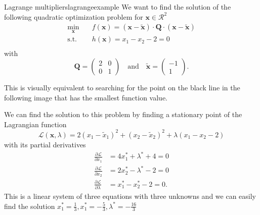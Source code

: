 \begin{example}{Lagrange multipliers}{lagrangeexample}
    We want to find the solution of the following quadratic optimization problem for $\mathbf{x} \in \mathcal{R}^2$
    \begin{equation}
        \begin{aligned}
            \min_{\mathbf{x}} \quad & f(\mathbf{x})= (\mathbf{x}-\tilde{\mathbf{x}}) \cdot \mathbf{Q} \cdot (\mathbf{x}-\tilde{\mathbf{x}})\\
            \textrm{s.t.} \quad     & h(\mathbf{x}) = x_1 - x_2 - 2 = 0  \\
        \end{aligned}
    \end{equation}
    with 
    \begin{equation}
        \mathbf{Q} = 
        \begin{pmatrix}
        2 & 0 \\
        0 & 1 
        \end{pmatrix} 
        \quad 
        \text{and}
        \quad
        \tilde{\mathbf{x}} = 
        \begin{pmatrix}
        -1\\
        1 
        \end{pmatrix}.
    \end{equation}

    This is visually equivalent to searching for the point on the black line in the following image that has the smallest function value.
    \begin{center}
        
    \end{center}

    We can find the solution to this problem by finding a stationary point of the Lagrangian function
    \begin{equation}
        \mathcal{\mathcal{L}}(\mathbf{x}, \lambda) = 2 (x_1-\tilde{x}_1)^2 + (x_2-\tilde{x}_2)^2 + \lambda (x_1 - x_2 -2)
    \end{equation}
    with its partial derivatives 
    \begin{align}
        \frac{\partial \mathcal{\mathcal{L}}}{\partial x_1} &= 4 x_1^* + \lambda^*  + 4 = 0\\
        \frac{\partial \mathcal{\mathcal{L}}}{\partial x_2} &= 2 x_2^* - \lambda^*  -2 = 0\\
        \frac{\partial \mathcal{\mathcal{L}}}{\partial \lambda} &= x_1^* - x_2^* -2 = 0.
    \end{align}
    This is a linear system of three equations with three unknowns and we can easily find the solution $x_1^*=\frac{1}{3} , x_1^*=-\frac{5}{3}, \lambda^*=-\frac{16}{3}$
\end{example}



